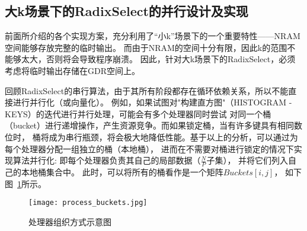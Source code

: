 

  \subsection{大k场景下的RadixSelect的并行设计及实现}

  前面所介绍的各个实现方案，充分利用了“小k”场景下的一个重要特性——NRAM空间能够存放完整的临时输出。
  而由于NRAM的空间十分有限，因此k的范围不能够太大，否则将会导致程序崩溃。
  因此，针对大k场景下的RadixSelect，必须考虑将临时输出存储在GDR空间上。
  
  回顾RadixSelect的串行算法，由于其所有阶段都存在循环依赖关系，所以不能直接进行并行化（或向量化）。
  例如，如果试图对"构建直方图"（HISTOGRAM - KEYS）的迭代进行并行处理，可能会有多个处理器同时尝试
  对同一个桶（bucket）进行递增操作，产生资源竞争。而如果锁定桶，当有许多键具有相同数位时，
  桶将成为串行瓶颈，将会极大地降低性能。基于以上的分析，可以通过为每个处理器分配一组独立的桶（本地桶），
进而在不需要对桶进行锁定的情况下实现算法并行化:
即每个处理器负责其自己的局部数据（\(\frac{N}{P}\)子集），
并将它们列入自己的本地桶集合中。
此时，可以将所有的桶看作是一个矩阵\(Buckets[i, j]\)，
如下图~\ref{fig:process_bucket}所示。

\begin{figure}[ht]
    \centering
    \texttt{[image: process\_buckets.jpg]}
    \caption{处理器组织方式示意图}
    \label{fig:process_bucket}
\end{figure}

